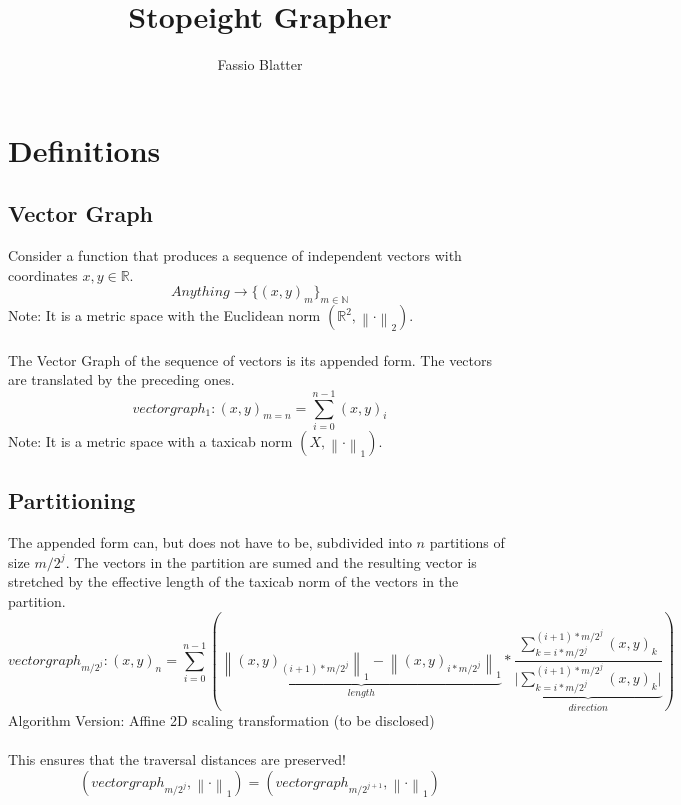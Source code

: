 \documentclass{report}
\newcommand\norm[1]{\left\lVert#1\right\rVert}
\begin{document}
\title{Stopeight Grapher}
\author{Fassio Blatter}
\maketitle

\chapter{Definitions}
\section{Vector Graph}
Consider a function that produces a sequence of independent vectors with coordinates $x,y \in \mathbb{R}$.
\begin{equation}
Anything \rightarrow \{(x,y)_{m}\}_{m \in \mathbb{N}}
\end{equation}
Note: It is a metric space with the Euclidean norm $(\mathbb{R}^2,\norm{\cdot}_2)$.\\\\
The Vector Graph of the sequence of vectors is its appended form. The vectors are translated by the preceding ones.\\
\begin{equation}
vectorgraph_{1}: (x,y)_{m=n}=\sum_{i=0}^{n-1} (x,y)_{i}
\end{equation}
Note: It is a metric space with a taxicab norm $(X,\norm{\cdot}_1)$.
\section{Partitioning}
The appended form can, but does not have to be, subdivided into $n$ partitions of size $m/2^j$. The vectors in the partition are sumed and the resulting vector is stretched by the effective length of the taxicab norm of the vectors in the partition.
\begin{equation}
vectorgraph_{m/2^{j}}:(x,y)_{n}=\sum_{i=0}^{n-1} (\underbrace{\norm{(x,y)_{(i+1)*m/2^j}}_{1} - \norm{(x,y)_{i*m/2^j}}_{1}}_{length} * \underbrace{\frac{\sum_{k=i*m/2^j}^{(i+1)*m/2^j} (x,y)_{k}}{\vert \sum_{k=i*m/2^j}^{(i+1)*m/2^{j}} (x,y)_{k} \vert}}_{direction})
\end{equation}
Algorithm Version: Affine 2D scaling transformation (to be disclosed)\\\\
This ensures that the traversal distances are preserved!
\begin{equation}
(vectorgraph_{m/2^j},\norm{\cdot}_{1})=(vectorgraph_{m/2^{j+1}},\norm{\cdot}_{1})
\end{equation}
\end{document}

